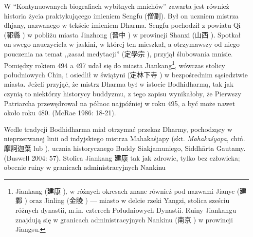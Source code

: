 W ``Kontynuowanych biografiach wybitnych mnichów'' zawarta jest również historia życia praktykującego imieniem Sengfu (僧副).
Był on uczniem mistrza dhjany, nazwanego w tekście imieniem Dharma. Sengfu pochodził z powiatu Qi (祁縣 ) w pobliżu miasta Jinzhong (晉中 ) w prowincji Shanxi (山西 ).
Spotkał on swego nauczyciela w jaskini, w której ten mieszkał, a otrzymawszy od niego pouczenia na temat ,,zasad medytacji'' (定學宗 ), przyjął ślubowania mnisie. Pomiędzy rokiem 494 a 497 udał się do miasta Jiankang\footnote{Jiankang (建康 ), w różnych okresach znane również pod nazwami Jianye (建鄴 ) oraz Jinling (金陵 ) --- miasto w delcie rzeki Yangzi, stolica sześciu różnych dynastii, m.in. czterech Południowych Dynastii. Ruiny Jiankangu znajdują się w granicach administracyjnych Nankinu (南京 ) w prowincji Jiangsu.}, wówczas stolicy południowych Chin, i osiedlił w świątyni (定林下寺 ) w bezpośrednim sąsiedztwie miasta.
Jeżeli przyjąć, że mistrz Dharma był w istocie Bodhidharmą, tak jak czynią to niektórzy historycy buddyzmu, z tego zapisu wynikałoby, że Pierwszy Patriarcha przewędrował na północ najpóźniej w roku 495, a być może nawet około roku 480.
(McRae 1986: 18-21).

Wedle tradycji Bodhidharma miał otrzymać przekaz Dharmy, pochodzący w nieprzerwanej linii od indyjskiego mistrza Mahakaśjapy (skt. \textit{Mahākāśyapa}, chiń. 摩訶迦葉  lub ), ucznia historycznego Buddy Siakjamuniego, Siddhārta Gautamy.
(Buswell 2004: 57).
Stolica Jiankang 建康 tak jak zdrowie, tylko bez człowieka; obecnie ruiny w granicach administracyjnych Nankinu
\fi %

